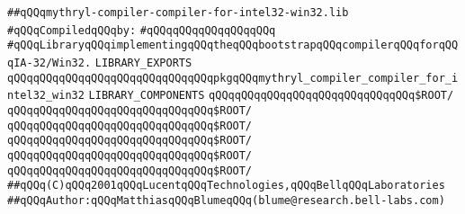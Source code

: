 \label{src/lib/core/mythryl-compiler-compiler/mythryl-compiler-compiler-for-intel32-win32.lib}
\verb|##qQQqmythryl-compiler-compiler-for-intel32-win32.lib|\newline
\newline
\verb|#qQQqCompiledqQQqby:|\newline
\verb|#qQQqqQQqqQQqqQQqqQQq|\newline
\newline
\newline
\newline
\verb|#qQQqLibraryqQQqimplementingqQQqtheqQQqbootstrapqQQqcompilerqQQqforqQQqIA-32/Win32.|\newline
\newline
\newline
\verb|LIBRARY_EXPORTS|\newline
\newline
\verb|qQQqqQQqqQQqqQQqqQQqqQQqqQQqqQQqpkgqQQqmythryl_compiler_compiler_for_intel32_win32|\newline
\newline
\newline
\newline
\verb|LIBRARY_COMPONENTS|\newline
\newline
\verb|qQQqqQQqqQQqqQQqqQQqqQQqqQQqqQQq$ROOT/|\newline
\verb|qQQqqQQqqQQqqQQqqQQqqQQqqQQqqQQq$ROOT/|\newline
\verb|qQQqqQQqqQQqqQQqqQQqqQQqqQQqqQQq$ROOT/|\newline
\verb|qQQqqQQqqQQqqQQqqQQqqQQqqQQqqQQq$ROOT/|\newline
\newline
\verb|qQQqqQQqqQQqqQQqqQQqqQQqqQQqqQQq$ROOT/|\newline
\verb|qQQqqQQqqQQqqQQqqQQqqQQqqQQqqQQq$ROOT/|\newline
\newline
\newline
\newline
\verb|##qQQq(C)qQQq2001qQQqLucentqQQqTechnologies,qQQqBellqQQqLaboratories|\newline
\verb|##qQQqAuthor:qQQqMatthiasqQQqBlumeqQQq(blume@research.bell-labs.com)|\newline

